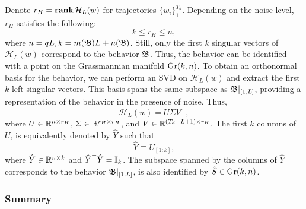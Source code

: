 Denote $r_H = \mathbf{rank} \, \mathcal{H}_L(w)$ for trajectories ${\{w_i\}}_1^{T_d}$. Depending on the noise level, $r_H$ satisfies the following:
\begin{equation}
  k \leq r_H \leq n,
\end{equation}
where $n = qL, k = m(\mathfrak{B})L + n(\mathfrak{B})$. Still, only the first $k$ singular vectors of $\mathcal{H}_L(w)$ correspond to the behavior $\mathfrak{B}$. Thus, the behavior can be identified with a point on the Grassmannian manifold $\text{Gr}(k, n)$. To obtain an orthonormal basis for the behavior, we can perform an SVD on $\mathcal{H}_L(w)$ and extract the first $k$ left singular vectors. This basis spans the same subspace as $\mathfrak{B}|_{[1,L]}$, providing a representation of the behavior in the presence of noise. Thus,
\begin{equation}
   \mathcal{H}_L(w) = U \Sigma V^\top,
\end{equation}
where $U \in \mathbb{R}^{n \times r_H}$, $\Sigma \in \mathbb{R}^{r_H \times r_H}$, and $V \in \mathbb{R}^{(T_d-L+1) \times r_H}$. The first $k$ columns of $U$, is equivalently denoted by $\hat{Y}$ such that
\begin{equation}
   \hat{Y} \equiv U_{[1:k]},
\end{equation}
where $\hat{Y} \in \mathbb{R}^{n \times k}$ and $\hat{Y}^\top \hat{Y} = \mathbb{I}_k$. The subspace spanned by the columns of $\hat{Y}$ corresponds to the behavior $\mathfrak{B}|_{[1,L]}$, is also identified by $\hat{S} \in \text{Gr}(k,n)$.

\subsubsection{Summary}
\begin{figure}[h]
   \centering
{}
\end{figure}




